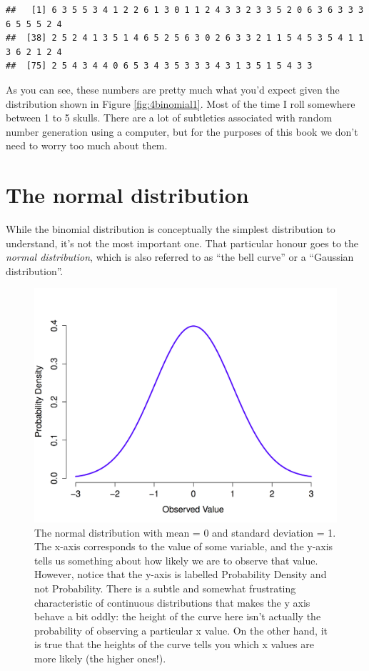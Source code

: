 \documentclass[
]{book}
\begin{document}
\begin{verbatim}
##   [1] 6 3 5 5 3 4 1 2 2 6 1 3 0 1 1 2 4 3 3 2 3 3 5 2 0 6 3 6 3 3 3 6 5 5 5 2 4
##  [38] 2 5 2 4 1 3 5 1 4 6 5 2 5 6 3 0 2 6 3 3 2 1 1 5 4 5 3 5 4 1 1 3 6 2 1 2 4
##  [75] 2 5 4 3 4 4 0 6 5 3 4 3 5 3 3 3 4 3 1 3 5 1 5 4 3 3
\end{verbatim}

As you can see, these numbers are pretty much what you'd expect given the distribution shown in Figure \ref{fig:4binomial1}. Most of the time I roll somewhere between 1 to 5 skulls. There are a lot of subtleties associated with random number generation using a computer, but for the purposes of this book we don't need to worry too much about them.

\hypertarget{the-normal-distribution}{%
\section{The normal distribution}\label{the-normal-distribution}}

While the binomial distribution is conceptually the simplest distribution to understand, it's not the most important one. That particular honour goes to the \emph{normal distribution}, which is also referred to as ``the bell curve'' or a ``Gaussian distribution''.

\begin{figure}
\centering
\includegraphics{navarro_img/probability/standardNormal-eps-converted-to.png}
\caption{\label{fig:4normal}The normal distribution with mean = 0 and standard deviation = 1. The x-axis corresponds to the value of some variable, and the y-axis tells us something about how likely we are to observe that value. However, notice that the y-axis is labelled Probability Density and not Probability. There is a subtle and somewhat frustrating characteristic of continuous distributions that makes the y axis behave a bit oddly: the height of the curve here isn't actually the probability of observing a particular x value. On the other hand, it is true that the heights of the curve tells you which x values are more likely (the higher ones!).}
\end{figure}
\end{document}
